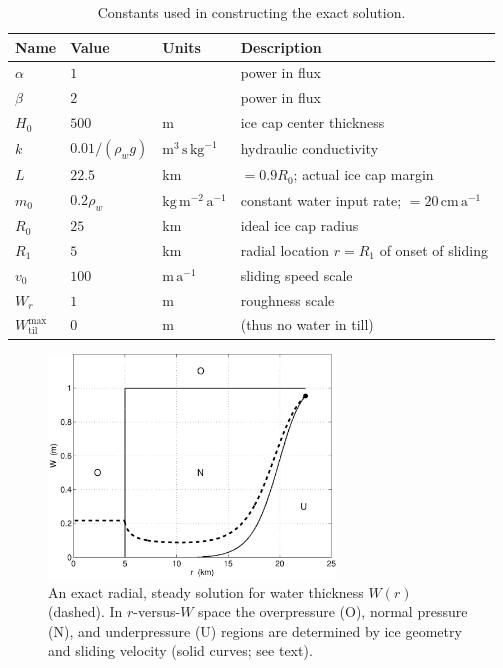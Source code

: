 \documentclass[gmd]{copernicus}   %
\newcommand{\text}{\textrm}
\newcommand{\Wtilmax}{W_{\text{til}}^{\text{max}}}
\begin{document}
\begin{table}[ht]
  \centering
  \caption{Constants used in constructing the exact solution.}
  \begin{tabular}{lllp{3.0in}}
    \textbf{Name} & \textbf{Value} & \textbf{Units} & \textbf{Description}\\
\hline
    $\alpha$ & $1$ & & power in flux \\
    $\beta$  & $2$ & & power in flux \\
    $H_0$ & $500$ & m & ice cap center thickness \\
    $k$   & $0.01/(\rho_w g)$ & $\text{m}^3\,\text{s}\,\text{kg}^{-1}$ & hydraulic conductivity \\
    $L$   & $22.5$& km & $=0.9 R_0$; actual ice cap margin \\
    $m_0$ & $0.2\rho_w$ & $\text{kg}\,\text{m}^{-2}\,\text{a}^{-1}$ & constant water input rate; $= 20 \,\text{cm}\,\text{a}^{-1}$ \\
    $R_0$ & $25$  & km & ideal ice cap radius \\
    $R_1$ & $5$   & km & radial location $r=R_1$ of onset of sliding \\
    $v_0$ & $100$ & $\text{m}\,\text{a}^{-1}$ & sliding speed scale \\
    $W_r$ & $1$ & m & roughness scale \\
    $\Wtilmax$ & 0 & m & (thus no water in till) \\
    \hline
  \end{tabular}
 \label{tab:verifconstants}
\end{table}

\begin{figure}[ht]
\includegraphics[width=3.0in,keepaspectratio=true]{exact-W-plot-onu}
\caption{An exact radial, steady solution for water thickness $W(r)$ (dashed).  In $r$-versus-$W$ space the overpressure (O), normal pressure (N), and underpressure (U) regions are determined by ice geometry and sliding velocity (solid curves; see text).}
\label{fig:Wexact}
\end{figure}
\end{document}
